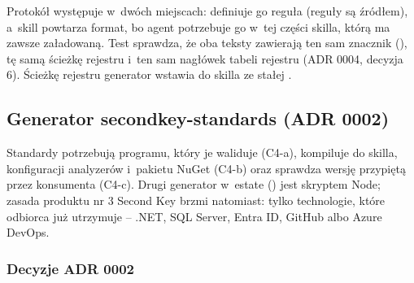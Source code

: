 Protokół występuje w~dwóch miejscach: definiuje go reguła (reguły są źródłem), a~skill
powtarza format, bo agent potrzebuje go w~tej części skilla, którą ma zawsze załadowaną. Test
 sprawdza, że oba teksty zawierają ten sam znacznik
(), tę samą ścieżkę rejestru i~ten sam nagłówek tabeli
rejestru (ADR 0004, decyzja 6). Ścieżkę rejestru generator wstawia do skilla ze stałej
.


\subsection{Generator secondkey-standards (ADR 0002)}\label{sec:standardy-generator}

Standardy potrzebują programu, który je waliduje (C4-a), kompiluje do skilla, konfiguracji
analyzerów i~pakietu NuGet (C4-b) oraz sprawdza wersję przypiętą przez konsumenta (C4-c).
Drugi generator w~estate () jest
skryptem Node; zasada produktu nr 3 Second Key brzmi natomiast: tylko technologie, które
odbiorca już utrzymuje -- .NET, SQL Server, Entra ID, GitHub albo Azure DevOps.

\subsubsection{Decyzje ADR 0002}

